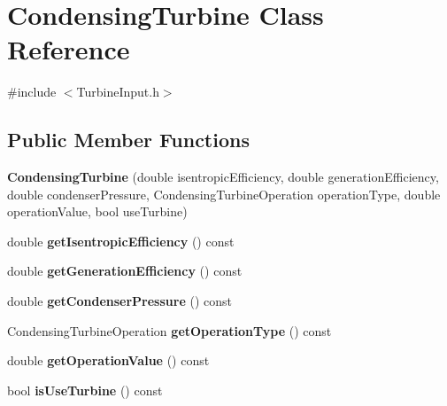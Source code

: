 \hypertarget{class_condensing_turbine}{}\section{Condensing\+Turbine Class Reference}
\label{class_condensing_turbine}


{\ttfamily \#include $<$Turbine\+Input.\+h$>$}

\subsection*{Public Member Functions}
\begin{DoxyCompactItemize}
\item 
\mbox{\label{class_condensing_turbine_a82cf4697556eebee1777cd26ec9a4776}} 
{\bfseries Condensing\+Turbine} (double isentropic\+Efficiency, double generation\+Efficiency, double condenser\+Pressure, Condensing\+Turbine\+Operation operation\+Type, double operation\+Value, bool use\+Turbine)
\item 
\mbox{\label{class_condensing_turbine_a7da0935b7826855e5a57561f6eac542a}} 
double {\bfseries get\+Isentropic\+Efficiency} () const
\item 
\mbox{\label{class_condensing_turbine_a76c3f6edd970f5cde5fdfca90a9b657c}} 
double {\bfseries get\+Generation\+Efficiency} () const
\item 
\mbox{\label{class_condensing_turbine_a318c217b329e9752e3316545595b25bd}} 
double {\bfseries get\+Condenser\+Pressure} () const
\item 
\mbox{\label{class_condensing_turbine_a2d6f79f0c23dd2a69dd606a031d62093}} 
Condensing\+Turbine\+Operation {\bfseries get\+Operation\+Type} () const
\item 
\mbox{\label{class_condensing_turbine_a2d4208cf1204e75b9aa3d9f10478a263}} 
double {\bfseries get\+Operation\+Value} () const
\item 
\mbox{\label{class_condensing_turbine_ae29c56a2fc4c8833f8a244b19d886fd4}} 
bool {\bfseries is\+Use\+Turbine} () const

\end{DoxyCompactItemize}
